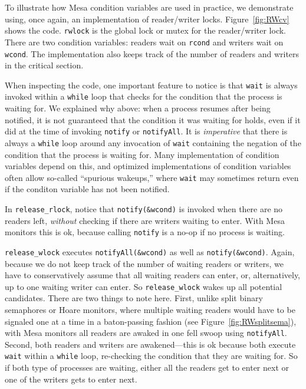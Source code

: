 \documentclass{report}
\begin{document}
To illustrate how Mesa condition variables are used in practice, we demonstrate using,
once again, an implementation of reader/writer locks.
Figure~\ref{fig:RWcv} shows the code.  \texttt{rwlock} is the global lock or mutex for the
reader/writer lock.  There are two condition variables: readers wait on \texttt{rcond} and
writers wait on \texttt{wcond}.  The implementation also keeps track of the number of
readers and writers in the critical section.

When inspecting the code, one important feature to notice is that \texttt{wait} is always
invoked within a \texttt{while} loop that checks for the condition that the process is
waiting for.  We explained why above: when a process resumes after
being notified, it is not guaranteed that the condition it was waiting for holds, even
if it did at the time of invoking \texttt{notify} or \texttt{notifyAll}.
It is \emph{imperative} that there is always a \texttt{while} loop around any invocation
of \texttt{wait} containing the negation of the condition that the process is waiting for.
Many implementation of condition variables depend on this, and optimized implementations
of condition variables often allow so-called ``spurious wakeups,'' where \texttt{wait}
may sometimes return even if the conditon variable has not been notified.

In \texttt{release\_rlock}, notice that \texttt{notify(\&wcond)} is invoked when there
are no readers left, \emph{without} checking if there are writers waiting to enter.
With Mesa monitors this is ok, because calling \texttt{notify} is a no-op if no process
is waiting.

\texttt{release\_wlock} executes \texttt{notifyAll(\&wcond)} as well as
\texttt{notify(\&wcond)}.
Again, because we do not keep track of the number of waiting readers or writers, we
have to conservatively assume that all waiting readers can enter, or, alternatively,
up to one waiting writer can enter.  So \texttt{release\_wlock} wakes up all
potential candidates.
There are two things to note here.  First, unlike split binary semaphores or Hoare
monitors, where multiple waiting readers would have to be signaled one at a time in a
baton-passing fashion (see Figure~\ref{fig:RWsplitsema}), with Mesa monitors
all readers are awaked in one fell swoop using \texttt{notifyAll}.
Second, both readers and writers are awakened---this is ok because both execute
\texttt{wait} within a \texttt{while} loop, re-checking the condition that they
are waiting for.  So if both type of processes are waiting, either all the readers
get to enter next or one of the writers gets to enter next.
\end{document}
